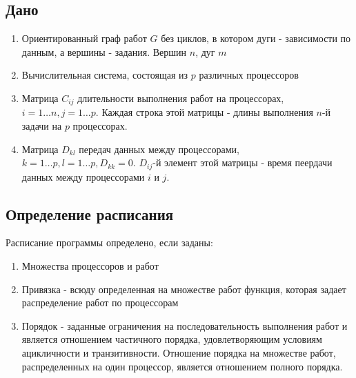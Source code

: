 \subsection{Дано}
\begin{enumerate}
    \item Ориентированный граф работ $G$ без циклов, в котором дуги - зависимости по данным, а вершины - задания. Вершин $n$, дуг $m$
    \item Вычислительная система, состоящая из $p$ различных процессоров
    \item Матрица $C_{ij}$ длительности выполнения работ на процессорах, $i=1 \dots n, j=1 \dots p$. Каждая строка этой матрицы - длины выполнения $n$-й задачи на $p$ процессорах. 
    \item Матрица $D_{kl}$ передач данных между процессорами, $k=1 \dots p, l = 1 \dots p, D_{kk} = 0$. $D_{ij}$-й элемент этой матрицы - время пеердачи данных между процессорами $i$ и $j$.
\end{enumerate}
\subsection{Определение расписания}
Расписание программы определено, если заданы:
\begin{enumerate}
    \item Множества процессоров и работ
    \item Привязка - всюду определенная на множестве работ функция, которая задает распределение работ по процессорам
    \item Порядок - заданные ограничения на последовательность выполнения работ и является отношением частичного порядка, удовлетворяющим условиям ацикличности и транзитивности. Отношение порядка на множестве работ, распределенных на один процессор, является отношением полного порядка.
\end{enumerate}
